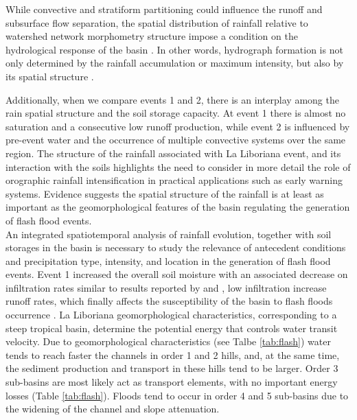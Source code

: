 \documentclass[hess, manuscript]{copernicus}
\begin{document}
While convective and stratiform partitioning could influence the runoff and subsurface flow separation,  the spatial distribution of rainfall relative to watershed network morphometry structure impose a condition on the hydrological response of the basin \citep{Douinot2016}. In other words, hydrograph formation is not only determined by the rainfall accumulation or maximum intensity, but also by its spatial structure \citep{Zoccatelli2011,Douinot2016}. 

Additionally, when we compare events 1 and 2, there is an interplay among the rain spatial structure and the soil storage capacity. At event 1 there is almost no saturation and a consecutive low runoff production, while event 2 is influenced by pre-event water and the occurrence of multiple convective systems over the same region.  The structure of the rainfall associated with La Liboriana event, and its interaction with the soils highlights the need to consider in more detail the role of orographic rainfall intensification in practical applications such as early warning systems.  Evidence suggests the spatial structure of the rainfall is at least as important as the geomorphological features of the basin regulating the generation of flash flood events.\\

An integrated spatiotemporal analysis of rainfall evolution, together with soil storages in the basin is necessary to study the relevance of antecedent conditions and precipitation type, intensity, and location in the generation of flash flood events.  Event 1 increased the overall soil moisture with an associated decrease on infiltration rates similar to results reported by \citet{Penna2011} and \citet{Zehe2010}, low infiltration increase runoff rates, which finally affects the susceptibility of the basin to  flash floods occurrence \citep{Wagner1999,Penna2011,Tramblay2012b}. La Liboriana geomorphological characteristics, corresponding to a steep tropical basin, determine the potential energy that controls water transit velocity.  Due to geomorphological characteristics (see Talbe \ref{tab:flash}) water tends to reach faster the channels in order 1 and 2 hills, and, at the same time, the sediment production and transport in these hills tend to be larger.  Order 3 sub-basins are most likely act as transport elements, with no important energy losses (Table \ref{tab:flash}). Floods tend to occur in order 4 and 5 sub-basins due to the widening of the channel and slope attenuation.\\
\end{document}
